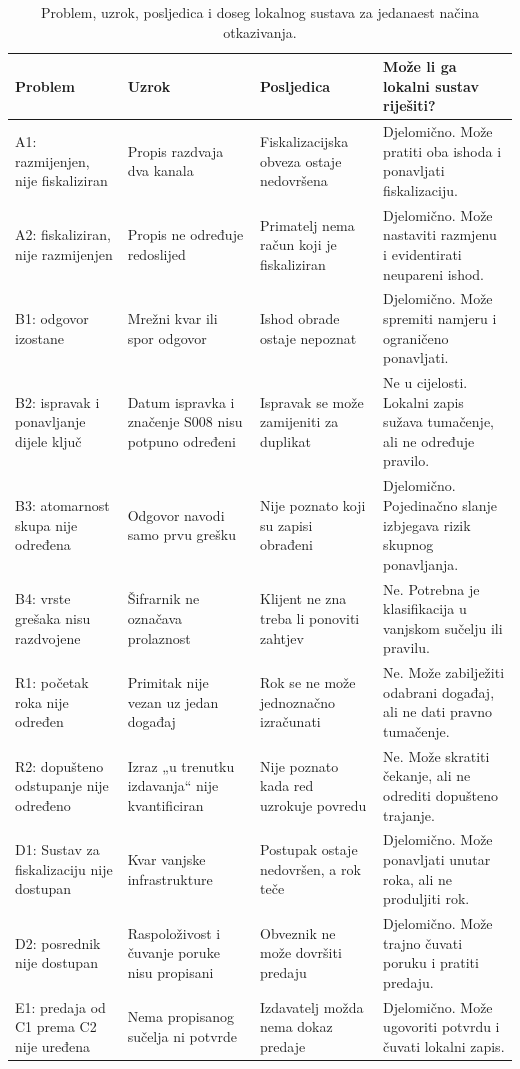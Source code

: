 \begin{table}[htbp]
\centering
\caption[Sažeti pregled načina otkazivanja]{Problem, uzrok, posljedica i
doseg lokalnog sustava za jedanaest načina otkazivanja.}
\label{tab:pregled-otkaza}
\footnotesize
\setlength{\tabcolsep}{4pt}
\begin{tabular}{@{}>{\raggedright\arraybackslash}p{}>{\raggedright\arraybackslash}p{}>{\raggedright\arraybackslash}p{}>{\raggedright\arraybackslash}p{}@{}}
\toprule
Problem & Uzrok & Posljedica & Može li ga lokalni sustav riješiti? \\
\midrule
A1: razmijenjen, nije fiskaliziran & Propis razdvaja dva kanala &
Fiskalizacijska obveza ostaje nedovršena & Djelomično. Može pratiti oba
ishoda i ponavljati fiskalizaciju. \\
\addlinespace
A2: fiskaliziran, nije razmijenjen & Propis ne određuje redoslijed &
Primatelj nema račun koji je fiskaliziran & Djelomično. Može nastaviti
razmjenu i evidentirati neupareni ishod. \\
\addlinespace
B1: odgovor izostane & Mrežni kvar ili spor odgovor & Ishod obrade ostaje
nepoznat & Djelomično. Može spremiti namjeru i ograničeno ponavljati. \\
\addlinespace
B2: ispravak i ponavljanje dijele ključ & Datum ispravka i značenje S008
nisu potpuno određeni & Ispravak se može zamijeniti za duplikat & Ne u
cijelosti. Lokalni zapis sužava tumačenje, ali ne određuje pravilo. \\
\addlinespace
B3: atomarnost skupa nije određena & Odgovor navodi samo prvu grešku &
Nije poznato koji su zapisi obrađeni & Djelomično. Pojedinačno slanje
izbjegava rizik skupnog ponavljanja. \\
\addlinespace
B4: vrste grešaka nisu razdvojene & Šifrarnik ne označava prolaznost &
Klijent ne zna treba li ponoviti zahtjev & Ne. Potrebna je klasifikacija u
vanjskom sučelju ili pravilu. \\
\addlinespace
R1: početak roka nije određen & Primitak nije vezan uz jedan događaj &
Rok se ne može jednoznačno izračunati & Ne. Može zabilježiti odabrani
događaj, ali ne dati pravno tumačenje. \\
\addlinespace
R2: dopušteno odstupanje nije određeno & Izraz „u trenutku izdavanja“ nije
kvantificiran & Nije poznato kada red uzrokuje povredu & Ne. Može skratiti
čekanje, ali ne odrediti dopušteno trajanje. \\
\addlinespace
D1: Sustav za fiskalizaciju nije dostupan & Kvar vanjske infrastrukture &
Postupak ostaje nedovršen, a rok teče & Djelomično. Može ponavljati unutar
roka, ali ne produljiti rok. \\
\addlinespace
D2: posrednik nije dostupan & Raspoloživost i čuvanje poruke nisu propisani &
Obveznik ne može dovršiti predaju & Djelomično. Može trajno čuvati poruku i
pratiti predaju. \\
\addlinespace
E1: predaja od C1 prema C2 nije uređena & Nema propisanog sučelja ni potvrde &
Izdavatelj možda nema dokaz predaje & Djelomično. Može ugovoriti potvrdu i
čuvati lokalni zapis. \\
\bottomrule
\end{tabular}
\end{table}

